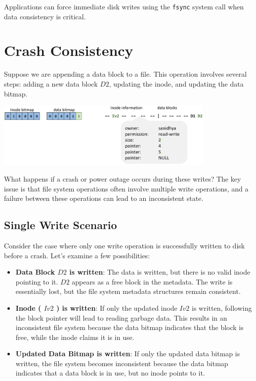 \documentclass[../../compsys.tex]{subfiles}
\begin{document}
Applications can force immediate disk writes using the \texttt{fsync} system call when data consistency is critical.

\section{Crash Consistency}

Suppose we are appending a data block to a file. This operation involves several steps: adding a new data block \( D2 \), updating the inode, and updating the data bitmap.

\begin{center}
  \includegraphics[width=0.8\textwidth]{chapters/L7/images/update.png}
\end{center}

What happens if a crash or power outage occurs during these writes? The key issue is that file system operations often involve multiple write operations, and a failure between these operations can lead to an inconsistent state.

\subsection{Single Write Scenario}

Consider the case where only one write operation is successfully written to disk before a crash. Let's examine a few possibilities:

\begin{itemize}
    \item \textbf{Data Block \( D2 \) is written}: The data is written, but there is no valid inode pointing to it. \( D2 \) appears as a free block in the metadata. The write is essentially lost, but the file system metadata structures remain consistent.
    \item \textbf{Inode ( \( Iv2 \) ) is written}: If only the updated inode \( Iv2 \) is written, following the block pointer will lead to reading garbage data. This results in an inconsistent file system because the data bitmap indicates that the block is free, while the inode claims it is in use.
    \item \textbf{Updated Data Bitmap is written}: If only the updated data bitmap is written, the file system becomes inconsistent because the data bitmap indicates that a data block is in use, but no inode points to it.
\end{itemize}
\end{document}

